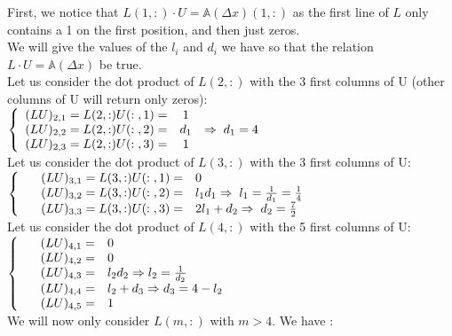\documentclass[10pt]{article}
\begin{document}
First, we notice that $L(1,:) \cdot U = \mathbb{A}(\Delta x)(1,:)$ as the first line of $L$ only contains a 1 on the first position, and then just zeros. \\

We will give the values of the $l_i$ and $d_i$ we have so that the relation $L \cdot U =\mathbb{A}(\Delta x)$ be true. \\

Let us consider the dot product of $L(2,:)$ with the 3 first columns of U (other columns of U will return only zeros):\\
$\left \{
 \begin{array}{r c l}
  (LU)_{2,1} = L(2,:)U(:\;,1) =&  1 \\
  (LU)_{2,2} = L(2,:)U(:\;,2) =& d_1 & \Rightarrow \; d_1 = 4 \\
  (LU)_{2,3} = L(2,:)U(:\;,3) =& 1\\
 \end{array}
   \right. $\\

   Let us consider the dot product of $L(3,:)$ with the 3 first columns of U:\\
   $\left \{
 \begin{array}{r c l}
   \;&(LU)_{3,1}=L(3,:)U(:\;,1)=&0  \\
   \;&(LU)_{3,2}=L(3,:)U(:\;,2)=&l_1 d_1 \Rightarrow \; l_1 = \frac{1}{d_1}= \frac{1}{4} \\
   \;&(LU)_{3,3}=L(3,:)U(:\;,3)=&2 l_1 + d_2 \Rightarrow \; d_2 = \frac{7}{2} \\
 \end{array}
   \right. $\\

 Let us consider the dot product of $L(4,:)$ with the 5 first columns of U:\\
   $\left \{
 \begin{array}{r c l}
   \;&(LU)_{4,1}=&0 \\
   \;&(LU)_{4,2}=&0 \\
   \;&(LU)_{4,3}=&l_2 d_2 \Rightarrow l_2 = \frac{1}{d_2} \\
   \;&(LU)_{4,4}=&l_2 + d_3 \Rightarrow d_3 = 4 - l_2 \\
   \;&(LU)_{4,5}=&1 \\   
 \end{array}
   \right. $\\
   
   We will now only consider $L(m,:)$ with $m>4$. We have :
\end{document}
